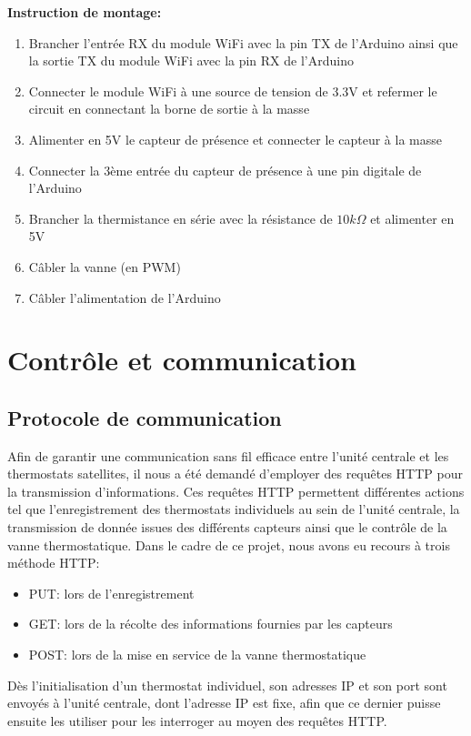 \documentclass[12pt]{report}
\begin{document}
\textbf{Instruction de montage:}
\begin{enumerate}
\item Brancher l'entrée RX du module WiFi avec la pin TX de l'Arduino ainsi que la sortie TX du module WiFi avec la pin RX de l'Arduino
\item Connecter le module WiFi à une source de tension de 3.3V et refermer le circuit en connectant la borne de sortie à la masse
\item Alimenter en 5V le capteur de présence et connecter le capteur à la masse
\item Connecter la 3ème entrée du capteur de présence à une pin digitale de l'Arduino
\item Brancher la thermistance en série avec la résistance de $10k\Omega$ et alimenter en 5V
\item Câbler la vanne (en PWM)
\item Câbler l'alimentation de l'Arduino
\end{enumerate}

\chapter{Contrôle et communication}
\section{Protocole de communication}
Afin de garantir une communication sans fil efficace entre l'unité centrale et les thermostats satellites, il nous a été demandé d'employer des requêtes HTTP \cite{_requests:_????} pour la transmission d'informations. Ces requêtes HTTP permettent différentes actions tel que l'enregistrement des thermostats individuels au sein de l'unité centrale, la transmission de donnée issues des différents capteurs ainsi que le contrôle de la vanne thermostatique. Dans le cadre de ce projet, nous avons eu recours à trois méthode HTTP: 

\begin{itemize}
\item PUT: lors de l'enregistrement 
\item GET: lors de la récolte des informations fournies par les capteurs
\item POST: lors de la mise en service de la vanne thermostatique
\end{itemize}

Dès l'initialisation d'un thermostat individuel, son adresses IP et son port sont envoyés à l'unité centrale, dont l'adresse IP est fixe, afin que ce dernier puisse ensuite les utiliser pour les interroger au moyen des requêtes HTTP.
\end{document}
